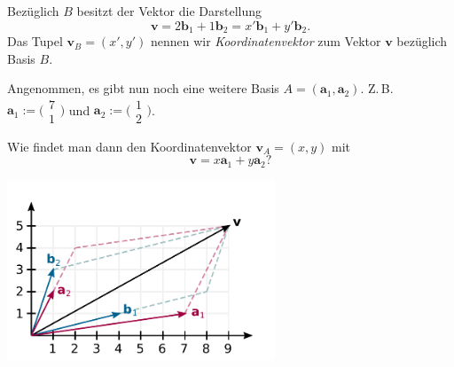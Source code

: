 \documentclass{beamer}
\newcommand{\bv}[1]{\mathbf{#1}}
\newcommand{\icol}[1]{
  \big(\!\begin{smallmatrix}#1\end{smallmatrix}\!\big)%
}
\begin{document}
\begin{frame}[t]
\vspace{2em}
Bezüglich $B$ besitzt der Vektor die Darstellung
\[\bv v = 2\bv b_1 + 1\bv b_2 = x'\bv b_1 + y'\bv b_2.
\]\pause
Das Tupel $\bv v_B = (x',y')$ nennen wir \emph{Koordinatenvektor}
zum Vektor $\bv v$ bezüglich Basis $B$.\pause

\vspace{0.8em}
Angenommen, es gibt nun noch eine weitere Basis $A=(\bv a_1,\bv a_2)$.
Z.\,B. $\bv a_1:=\icol{7\\ 1}$ und $\bv a_2:=\icol{1\\ 2}$.\pause

\vspace{1.2em}
Wie findet man dann den Koordinatenvektor $\bv v_A=(x,y)$ mit
\[\bv v = x\bv a_1 + y\bv a_2?\]
\end{frame}

\begin{frame}
\begin{center}
\includegraphics[width=80mm]{img/Vektor-in-Basis-BA.pdf}
\end{center}
\end{frame}
\end{document}
